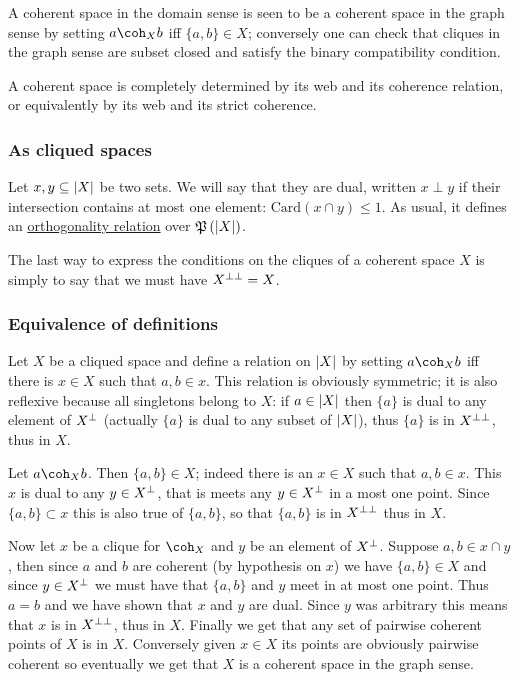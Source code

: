 A coherent space in the domain sense is seen to be a coherent space in
the graph sense by setting \(a\coh_X b\) iff \(\{a,b\}\in X\);
conversely one can check that cliques in the graph sense are subset
closed and satisfy the binary compatibility condition.

A coherent space is completely determined by its web and its coherence
relation, or equivalently by its web and its strict coherence.

\subsubsection{As cliqued spaces}\label{as-cliqued-spaces}

\begin{definition}[Duality]
Let $x, y\subseteq \left|X\right|$ be two sets. We will say that they are dual, written $x\perp y$ if their intersection contains at most one element: $\mathrm{Card}(x\cap y)\leq 1$. As usual, it defines an \hyperref[orthogonality-relation]{orthogonality relation} over $\mathfrak{P}\left(\left|X\right|\right)$.
\end{definition}

The last way to express the conditions on the cliques of a coherent
space \(X\) is simply to say that we must have \(X^{\bot\bot} = X\).

\subsubsection{Equivalence of definitions}\label{equivalence-of-definitions}

Let \(X\) be a cliqued space and define a relation on \(\left|X\right|\) by
setting \(a\coh_X b\) iff there is \(x\in X\) such that \(a, b\in x\).
This relation is obviously symmetric; it is also reflexive because all
singletons belong to \(X\): if \(a\in \left|X\right|\) then \(\{a\}\) is dual to
any element of \(X^\bot\) (actually \(\{a\}\) is dual to any subset of
\(\left|X\right|\)), thus \(\{a\}\) is in \(X^{\bot\bot}\), thus in \(X\).

Let \(a\coh_X b\). Then \(\{a,b\}\in X\); indeed there is an \(x\in X\)
such that \(a, b\in x\). This \(x\) is dual to any \(y\in X^\bot\), that
is meets any \(y\in X^\bot\) in a most one point. Since
\(\{a,b\}\subset x\) this is also true of \(\{a,b\}\), so that
\(\{a,b\}\) is in \(X^{\bot\bot}\) thus in \(X\).

Now let \(x\) be a clique for \(\coh_X\) and \(y\) be an element of
\(X^\bot\). Suppose \(a, b\in x\cap y\), then since \(a\) and \(b\) are
coherent (by hypothesis on \(x\)) we have \(\{a,b\}\in X\) and since
\(y\in X^\bot\) we must have that \(\{a,b\}\) and \(y\) meet in at most
one point. Thus \(a = b\) and we have shown that \(x\) and \(y\) are
dual. Since \(y\) was arbitrary this means that \(x\) is in
\(X^{\bot\bot}\), thus in \(X\). Finally we get that any set of pairwise
coherent points of \(X\) is in \(X\). Conversely given \(x\in X\) its
points are obviously pairwise coherent so eventually we get that \(X\)
is a coherent space in the graph sense.


